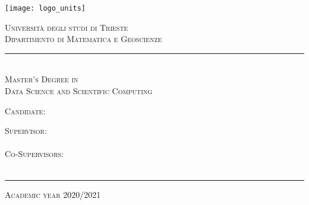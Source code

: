 \graphicspath{{frontmatter/figures/}}
\begin{titlepage}
	
	\begin{center}
	
		\texttt{[image: logo\_units]}\\[0.4cm]
			
		\vspace{0.8cm}
		
		{ \huge \scshape Università degli studi di Trieste }\\[0.25cm]
		{ \Large \scshape Dipartimento di Matematica e Geoscienze }
		\rule{\textwidth}{0.4pt}\\[1cm]

 		{ \Large \scshape Master's Degree in\\Data Science and Scientific Computing }\\[2cm]
		
		
		{ \huge \bfseries \THtitle }
		
		\vfill
				
		\begin{minipage}[t]{0.45\textwidth}
			\begin{flushleft} %
				{ \large \scshape Candidate: }\\[0.25cm]
				{ \THauthor }
			\end{flushleft}
		\end{minipage}
		\begin{minipage}[t]{0.45\textwidth}
			\begin{flushright} %
				{ \large \scshape Supervisor: } \\[0.25cm]
				{ \THsupervisor } \\[0.50cm]
				{ \large \scshape Co-Supervisors: } \\[0.25cm]
				{ \THcosupervisor }\\[0.20cm]
				{ \THextracosupervisor }
			\end{flushright}
		\end{minipage}
		
		\vspace{2cm}
		
		\rule{\textwidth}{0.4pt}
		{\large \scshape Academic year 2020/2021 }
		
	\end{center}
	
	\restoregeometry

\end{titlepage}

\clearpage
\thispagestyle{empty}